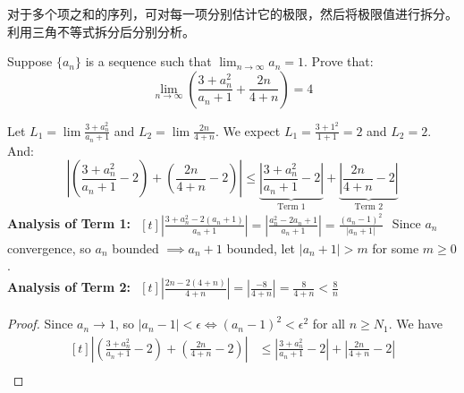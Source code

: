 \documentclass[
	UTF-8,
	11pt, %
	a4paper, %
]{LegrandOrangeBook}
\begin{document}
    \begin{remark}
        对于多个项之和的序列，可对每一项分别估计它的极限，然后将极限值进行拆分。利用三角不等式拆分后分别分析。
    \end{remark}

    \newpage

    \begin{example}
    Suppose $\{a_n\}$ is a sequence such that $\lim_{n \to \infty} a_n = 1$. Prove that:
    \[ \lim_{n \to \infty} \left( \frac{3 + a_n^2}{a_n + 1} + \frac{2n}{4+n} \right) = 4 \]

    \begin{analysis}
        Let $L_1 = \lim \frac{3+a_n^2}{a_n+1}$ and $L_2 = \lim \frac{2n}{4+n}$.
        We expect $L_1 = \frac{3+1^2}{1+1} = 2$ and $L_2 = 2$. And:
            \[ \left| \left( \frac{3 + a_n^2}{a_n + 1} - 2 \right) + \left( \frac{2n}{4+n} - 2 \right) \right| \le \underbrace{\left| \frac{3 + a_n^2}{a_n + 1} - 2 \right|}_{\text{Term 1}} + \underbrace{\left| \frac{2n}{4+n} - 2 \right|}_{\text{Term 2}} \]
            \textbf{Analysis of Term 1:}
            $
            \begin{aligned}[t]
                \left| \frac{3 + a_n^2 - 2(a_n + 1)}{a_n + 1} \right| = \left| \frac{a_n^2 - 2a_n + 1}{a_n + 1} \right| = \frac{(a_n - 1)^2}{|a_n + 1|}
            \end{aligned}
            $
            Since $a_n$ convergence, so 
            $a_n$ bounded $\implies a_n +1$ bounded, let $|a_n+1|>m$ for some $m\geq 0$.\\[2ex]
            \textbf{Analysis of Term 2:}
            $
            \begin{aligned}[t]
                \left| \frac{2n - 2(4+n)}{4+n} \right| = \left| \frac{-8}{4+n} \right| = \frac{8}{4+n} < \frac{8}{n}
            \end{aligned}
            $
    \end{analysis}
    \begin{proof}
        Since $a_n \to 1$, so $|a_n-1|< \epsilon \iff  (a_n - 1)^2 < \epsilon^2 $ for all $n \geq N_1$. We have 
        $$
        \begin{aligned}[t]
            \left| \left( \frac{3 + a_n^2}{a_n + 1} - 2 \right) + \left( \frac{2n}{4+n} - 2 \right) \right| 
            &\le \left| \frac{3 + a_n^2}{a_n + 1} - 2 \right| + \left| \frac{2n}{4+n} - 2 \right| \\

\end{aligned}$$
\end{proof}
\end{example}
\end{document}
